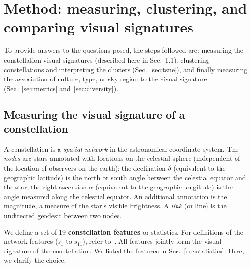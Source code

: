\documentclass[10pt]{article}
\begin{document}

\section{Method: measuring, clustering, and comparing visual signatures}
\label{sec:method}

To provide answers to the questions posed, the steps followed are: measuring the constellation visual signatures (described here in Sec.~\ref{sec:features}), clustering constellations and interpreting the clusters (Sec.~\ref{sec:tsne}), and finally measuring the association of culture, type, or sky region to the visual signature (Sec.~\ref{sec:metrics} and~\ref{sec:diversity}).

\subsection{Measuring the visual signature of a constellation}
\label{sec:features}

A constellation is a \emph{spatial network} in the astronomical coordinate system. The \emph{nodes} are stars annotated with locations on the celestial sphere (independent of the location of observers on the earth): the declination $\delta$ (equivalent to the geographic latitude) is the north or south angle between the celestial equator and the star; the right ascension $\alpha$ (equivalent to the geographic longitude) is the angle measured along the celestial equator. An additional annotation is the magnitude, a measure of the star's visible brightness. A \emph{link} (or line) is the undirected geodesic between two nodes. 

We define a set of 19 {\bf constellation features} or statistics. For definitions of the network features ($s_1$ to $s_{11}$), refer to~\cite{newman2018networks}. All features jointly form the visual signature of the constellation. We listed the features in Sec.~\ref{sec:statistics}. Here, we clarify the choice.
\end{document}

